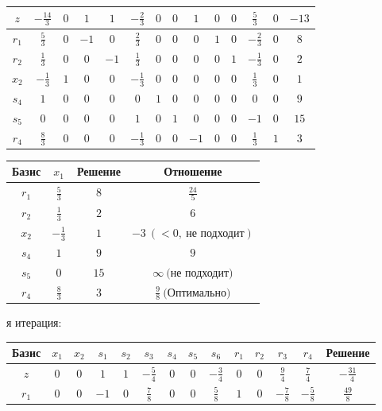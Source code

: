 \documentclass{article}%
\begin{document}
\begin{flushleft}
\begin{tabular}{|c|cccccccccccc|c|}
\hline%
$z$&$-\frac{14}{3}$&$0$&$1$&$1$&$-\frac{2}{3}$&$0$&$0$&$1$&$0$&$0$&$\frac{5}{3}$&$0$&$-13$\\%
\hline%
$r_{1}$&$\frac{5}{3}$&$0$&$-1$&$0$&$\frac{2}{3}$&$0$&$0$&$0$&$1$&$0$&$-\frac{2}{3}$&$0$&$8$\\%
$r_{2}$&$\frac{1}{3}$&$0$&$0$&$-1$&$\frac{1}{3}$&$0$&$0$&$0$&$0$&$1$&$-\frac{1}{3}$&$0$&$2$\\%
$x_{2}$&$-\frac{1}{3}$&$1$&$0$&$0$&$-\frac{1}{3}$&$0$&$0$&$0$&$0$&$0$&$\frac{1}{3}$&$0$&$1$\\%
$s_{4}$&$1$&$0$&$0$&$0$&$0$&$1$&$0$&$0$&$0$&$0$&$0$&$0$&$9$\\%
$s_{5}$&$0$&$0$&$0$&$0$&$1$&$0$&$1$&$0$&$0$&$0$&$-1$&$0$&$15$\\%
$r_{4}$&$\frac{8}{3}$&$0$&$0$&$0$&$-\frac{1}{3}$&$0$&$0$&$-1$&$0$&$0$&$\frac{1}{3}$&$1$&$3$\\%
\hline%
\end{tabular}%
\newline%
\newline%
\newline%
\begin{tabular}{|cccc|}%
\hline%
Базис&$x_{1}$&Решение&Отношение\\%
\hline%
$r_{1}$&$\frac{5}{3}$&$8$&$\frac{24}{5}$\\%
$r_{2}$&$\frac{1}{3}$&$2$&$6$\\%
$x_{2}$&$-\frac{1}{3}$&$1$&$-3\: (< 0, \: \text{не подходит})$\\%
$s_{4}$&$1$&$9$&$9$\\%
$s_{5}$&$0$&$15$&$\infty \: \text{(не подходит)}$\\%
$r_{4}$&$\frac{8}{3}$&$3$&$\frac{9}{8}\: \text{(Оптимально)}$\\%
\hline%
\end{tabular}%
\newline%
\newline%
я итерация: %
\newline%
\newline%
\renewcommand{\arraystretch}{1.3}%
\begin{tabular}{|c|cccccccccccc|c|}%
\hline%
Базис&$x_{1}$&$x_{2}$&$s_{1}$&$s_{2}$&$s_{3}$&$s_{4}$&$s_{5}$&$s_{6}$&$r_{1}$&$r_{2}$&$r_{3}$&$r_{4}$&Решение\\%
\hline%
$z$&$0$&$0$&$1$&$1$&$-\frac{5}{4}$&$0$&$0$&$-\frac{3}{4}$&$0$&$0$&$\frac{9}{4}$&$\frac{7}{4}$&$-\frac{31}{4}$\\%
\hline%
$r_{1}$&$0$&$0$&$-1$&$0$&$\frac{7}{8}$&$0$&$0$&$\frac{5}{8}$&$1$&$0$&$-\frac{7}{8}$&$-\frac{5}{8}$&$\frac{49}{8}$\\%

\end{tabular}
\end{flushleft}
\end{document}
